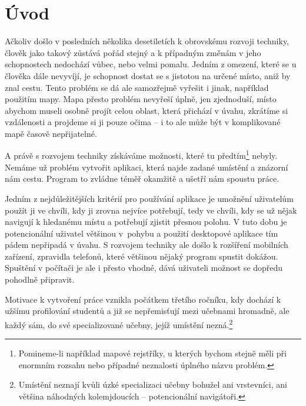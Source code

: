 \chapter{Úvod}
Ačkoliv došlo v posledních několika desetiletích k obrovskému rozvoji techniky, člověk jako takový zůstává pořád stejný a k případným změnám v jeho schopnostech nedochází vůbec, nebo velmi pomalu. Jedním z omezení, které se u člověka dále nevyvíjí, je schopnost dostat se s jistotou na určené místo, aniž by znal cestu. Tento problém se dá ale samozřejmě vyřešit i jinak, například použitím mapy. Mapa přesto problém nevyřeší úplně, jen zjednoduší, místo abychom museli osobně projít celou oblast, která přichází v úvahu, zkrátíme si vzdálenosti a projdeme si ji pouze očima -- i to ale může být v komplikované mapě časově nepřijatelné.

A právě s rozvojem techniky získáváme možnosti, které tu předtím\footnote{Pomineme-li například mapové rejstříky, u kterých bychom stejně měli při enormním rozsahu nebo případné neznalosti úplného názvu problém.} nebyly. Nemáme už problém vytvořit aplikaci, která najde zadané umístění a znázorní nám cestu. Program to zvládne téměř okamžitě a ušetří nám spoustu práce.

Jedním z nejdůležitějších kritérií pro používání aplikace je umožnění uživatelům použít ji ve chvíli, kdy ji zrovna nejvíce potřebují, tedy ve chvíli, kdy se už nějak navigují k hledanému místu a potřebují zjistit přesnou polohu. V tuto dobu je potencionální uživatel většinou v~pohybu a použití desktopové aplikace tím pádem nepřipadá v úvahu. S rozvojem techniky ale došlo k rozšíření mobilních zařízení, zpravidla telefonů, které většinou nějaký program spustit dokážou. Spuštění v počítači je ale i přesto vhodné, dává uživateli možnost se dopředu pohodlně připravit.

Motivace k vytvoření práce vznikla počátkem třetího ročníku, kdy dochází k užšímu profilování studentů a již se nepřemisťují mezi učebnami hromadně, ale každý sám, do své specializované učebny, jejíž umístění nezná.\footnote{Umístění neznají kvůli úzké specializaci učebny bohužel ani vrstevníci, ani většina náhodných kolemjdoucích -- potencionální navigátoři.}
